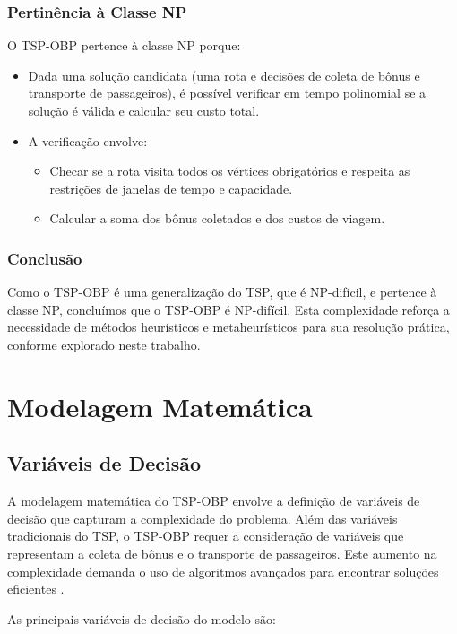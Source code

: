 \documentclass[12pt, a4paper]{report}
\begin{document}
\subsection{Pertinência à Classe NP}
O TSP-OBP pertence à classe NP porque:
\begin{itemize}
    \item Dada uma solução candidata (uma rota e decisões de coleta de bônus e transporte de passageiros), é possível verificar em tempo polinomial se a solução é válida e calcular seu custo total.
    \item A verificação envolve:
    \begin{itemize}
        \item Checar se a rota visita todos os vértices obrigatórios e respeita as restrições de janelas de tempo e capacidade.
        \item Calcular a soma dos bônus coletados e dos custos de viagem.
    \end{itemize}
\end{itemize}

\subsection{Conclusão}
Como o TSP-OBP é uma generalização do TSP, que é NP-difícil, e pertence à classe NP, concluímos que o TSP-OBP é NP-difícil. Esta complexidade reforça a necessidade de métodos heurísticos e metaheurísticos para sua resolução prática, conforme explorado neste trabalho.

\chapter{Modelagem Matemática}

\section{Variáveis de Decisão}
A modelagem matemática do TSP-OBP envolve a definição de variáveis de decisão que capturam a complexidade do problema. Além das variáveis tradicionais do TSP, o TSP-OBP requer a consideração de variáveis que representam a coleta de bônus e o transporte de passageiros. Este aumento na complexidade demanda o uso de algoritmos avançados para encontrar soluções eficientes \cite{carvalho2022}.

As principais variáveis de decisão do modelo são:
\end{document}
